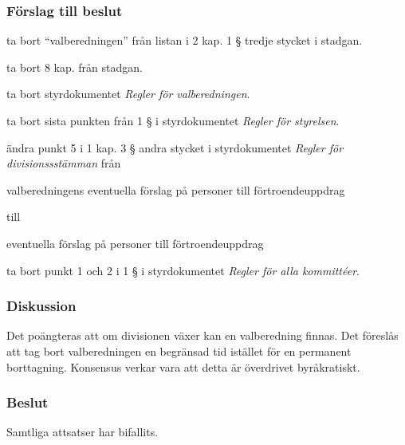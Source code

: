 \documentclass[protokoll]{dvd}
\begin{document}
\subsubsection*{Förslag till beslut}

\begin{attsatser}
	\item ta bort ``valberedningen'' från listan i 2 kap. 1 § tredje stycket i stadgan.

	\item ta bort 8 kap. från stadgan.

	\item ta bort styrdokumentet \emph{Regler för valberedningen}.

	\item ta bort sista punkten från 1 § i styrdokumentet \emph{Regler för styrelsen}.

	\item ändra punkt 5 i 1 kap. 3 § andra stycket i styrdokumentet \emph{Regler för divisionssstämman} från

	\begin{displayquote}
		valberedningens eventuella förslag på personer till förtroendeuppdrag
	\end{displayquote}

	till

	\begin{displayquote}
		eventuella förslag på personer till förtroendeuppdrag
	\end{displayquote}

	\item ta bort punkt 1 och 2 i 1 § i styrdokumentet \emph{Regler för alla kommittéer}.
\end{attsatser}

\subsubsection{Diskussion}
Det poängteras att om divisionen växer kan en valberedning finnas. Det föreslås att tag bort valberedningen en begränsad tid istället för en permanent borttagning. Konsensus verkar vara att detta är överdrivet byråkratiskt.

\subsubsection{Beslut}
\begin{attsatser}
	\item Samtliga attsatser har bifallits.
\end{attsatser}
\end{document}
